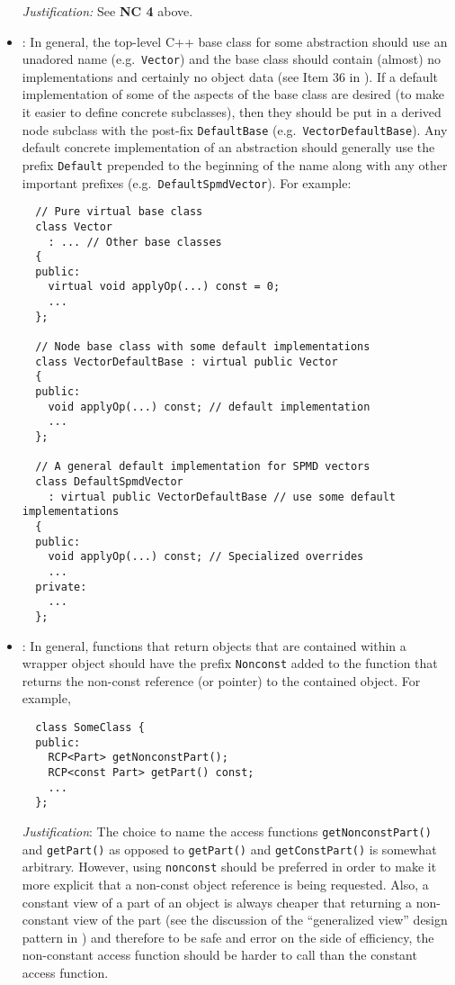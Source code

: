\begin{itemize}
{}\textit{Justification:} See {}\textbf{NC 4} above.


{}\item\NCBaseDefaultClassNames: In general, the top-level C++ base
class for some abstraction should use an unadored name (e.g.\
{}\texttt{Vector}) and the base class should contain (almost) no
implementations and certainly no object data (see Item 36 in
{}\cite{C++CodingStandards05}).  If a default implementation of some
of the aspects of the base class are desired (to make it easier to
define concrete subclasses), then they should be put in a derived node
subclass with the post-fix {}\texttt{DefaultBase} (e.g.\
{}\texttt{Vector\-Default\-Base}).  Any default concrete
implementation of an abstraction should generally use the prefix
{}\texttt{Default} prepended to the beginning of the name along with
any other important prefixes (e.g.\ {}\texttt{DefaultSpmdVector}).
For example:

{\small\begin{verbatim}
  // Pure virtual base class 
  class Vector
    : ... // Other base classes
  {
  public:
    virtual void applyOp(...) const = 0;
    ...
  };

  // Node base class with some default implementations
  class VectorDefaultBase : virtual public Vector
  {
  public:
    void applyOp(...) const; // default implementation
    ...
  };

  // A general default implementation for SPMD vectors
  class DefaultSpmdVector
    : virtual public VectorDefaultBase // use some default implementations
  {
  public:
    void applyOp(...) const; // Specialized overrides
    ...
  private:
    ...
  };
\end{verbatim}}


{}\item\NCConstNonconstAccessFunctionName: In general, functions that return
objects that are contained within a wrapper object should have the prefix
{}\texttt{Nonconst} added to the function that returns the non-const reference
(or pointer) to the contained object.  For example,

{\small\begin{verbatim}
  class SomeClass {
  public:
    RCP<Part> getNonconstPart();
    RCP<const Part> getPart() const;
    ...
  };
\end{verbatim}}

{}\textit{Justification}: The choice to name the access functions
{}\texttt{getNonconstPart()} and {}\texttt{getPart()} as opposed to
{}\texttt{getPart()} and {}\texttt{getConstPart()} is somewhat arbitrary.
However, using {}\texttt{nonconst} should be preferred in order to make it
more explicit that a non-const object reference is being requested.  Also, a
constant view of a part of an object is always cheaper that returning a
non-constant view of the part (see the discussion of the ``generalized view''
design pattern in {}\cite{TeuchosMemoryManagementGuide}) and therefore to be
safe and error on the side of efficiency, the non-constant access function
should be harder to call than the constant access function.


\end{itemize}


